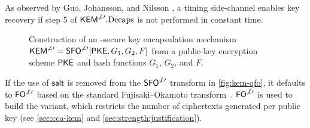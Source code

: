 As observed by Guo, Johansson, and Nilsson \cite{C:GuoJohNil20}, a timing side-channel enables key recovery if  step 5 of $\textsf{\upshape\mdseries KEM}^{\not\perp\prime}.\textrm{\upshape\mdseries Decaps}$ is not performed in constant time.

\begin{figure}[h]
\centering
{}
\caption{Construction of an \INDCCA-secure key encapsulation mechanism
  $\textsf{\upshape\mdseries KEM}^{\not\perp\prime}=\textsf{\upshape\mdseries SFO}^{\not\perp\prime}[\textsf{\upshape\mdseries PKE},G_1,G_2,F]$ from a public-key
  encryption scheme $\textsf{\upshape\mdseries PKE}$ and hash functions $G_1$, $G_2$, and $F$.}
\label{fig:kem-qfo}
\end{figure}

\begin{remark}
If the use of ${\mathsf{salt}}$ is removed from the $\textsf{\upshape\mdseries SFO}^{\not\perp\prime}$ transform in \autoref{fig:kem-qfo},
it defaults to $\textsf{\upshape\mdseries FO}^{\not\perp\prime}$ based on the standard Fujisaki--Okamoto transform~\cite{EuroSP:Kyber,NISTPQC-R3:FrodoKEM20}.
$\textsf{\upshape\mdseries FO}^{\not\perp\prime}$ is used to build the \eFrodoKEM variant, which restricts the number of ciphertexts generated per public key (see \autoref{sec:cca-kem} and \autoref{sec:strength:justification}).
\end{remark}

